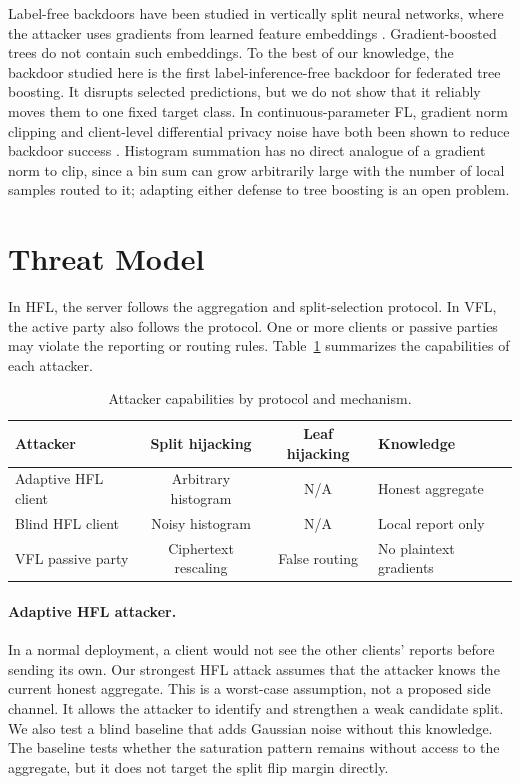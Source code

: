\documentclass[11pt]{article}
\begin{document}
Label-free backdoors have been studied in vertically split neural networks, where the attacker uses gradients from learned feature embeddings \cite{shen2025labelfree}. Gradient-boosted trees do not contain such embeddings. To the best of our knowledge, the backdoor studied here is the first label-inference-free backdoor for federated tree boosting. It disrupts selected predictions, but we do not show that it reliably moves them to one fixed target class. In continuous-parameter FL, gradient norm clipping and client-level differential privacy noise have both been shown to reduce backdoor success \cite{sun2019backdoor,geyer2017dpfed}. Histogram summation has no direct analogue of a gradient norm to clip, since a bin sum can grow arbitrarily large with the number of local samples routed to it; adapting either defense to tree boosting is an open problem.

\section{Threat Model}
\label{sec:threatmodel}

In HFL, the server follows the aggregation and split-selection protocol. In VFL, the active party also follows the protocol. One or more clients or passive parties may violate the reporting or routing rules. Table~\ref{tab:threatmodel} summarizes the capabilities of each attacker.

\begin{table}[htbp]
\centering
\caption{Attacker capabilities by protocol and mechanism.}
\begin{tabular}{lccl}
\toprule
Attacker & Split hijacking & Leaf hijacking & Knowledge \\
\midrule
Adaptive HFL client & Arbitrary histogram & N/A & Honest aggregate \\
Blind HFL client & Noisy histogram & N/A & Local report only \\
VFL passive party & Ciphertext rescaling & False routing & No plaintext gradients \\
\bottomrule
\end{tabular}
\label{tab:threatmodel}
\end{table}

\paragraph{Adaptive HFL attacker.}
In a normal deployment, a client would not see the other clients' reports before sending its own. Our strongest HFL attack assumes that the attacker knows the current honest aggregate. This is a worst-case assumption, not a proposed side channel. It allows the attacker to identify and strengthen a weak candidate split. We also test a blind baseline that adds Gaussian noise without this knowledge. The baseline tests whether the saturation pattern remains without access to the aggregate, but it does not target the split flip margin directly.
\end{document}
